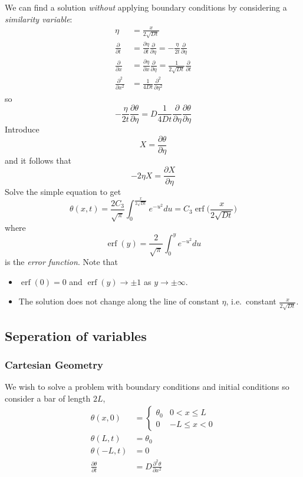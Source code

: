 \documentclass[a4paper]{article}
\DeclareMathOperator{\erf}{erf}
\begin{document}
We can find a solution \emph{without} applying boundary conditions by considering a \emph{similarity variable}:
\begin{align*}
  \eta &= \frac{x}{2\sqrt{Dt}} \\
  \frac{\partial  }{\partial t} &= \frac{\partial \eta}{\partial t} \frac{\partial  }{\partial \eta} = -\frac{\eta}{2t} \frac{\partial  }{\partial \eta} \\
  \frac{\partial  }{\partial x} &= \frac{\partial \eta}{\partial x} \frac{\partial  }{\partial \eta} = \frac{1}{2\sqrt{Dt}} \frac{\partial  }{\partial t} \\
  \frac{\partial^2  }{\partial x^2} &= \frac{1}{4Dt} \frac{\partial^2  }{\partial \eta^2}
\end{align*}
so
\[
  -\frac{\eta}{2t} \frac{\partial \theta}{\partial \eta} = D \frac{1}{4Dt} \frac{\partial  }{\partial \eta} \frac{\partial \theta}{\partial \eta}
\]
Introduce
\[
  X = \frac{\partial \theta}{\partial \eta}
\]
and it follows that
\[
  -2\eta X = \frac{\partial X}{\partial \eta}
\]
Solve the simple equation to get
\[
  \theta(x,t) = \frac{2C_3}{\sqrt \pi} \int_{0}^{\frac{x}{2\sqrt{Dt}}} e^{-u^2} du  = C_3 \erf \Big( \frac{x}{2\sqrt{Dt}} \Big)
\]
where
\[
  \erf(y) = \frac{2}{\sqrt \pi} \int_{0}^{y} e^{-u^2} du
\]
is the \emph{error function}. Note that
\begin{itemize}
\item \(\erf(0) = 0\) and \(\erf(y) \to \pm 1\) as \(y \to \pm \infty\).
\item The solution does not change along the line of constant \(\eta\), i.e.\ constant \(\frac{x}{2\sqrt{Dt}}\).
\end{itemize}

\subsection{Seperation of variables}

\subsubsection{Cartesian Geometry}

We wish to solve a problem with boundary conditions and initial conditions so consider a bar of length \(2L\),
\begin{align*}
  \theta(x,0) &=
  \begin{cases}
    \theta_0 & 0 < x \leq L \\
    0 & -L \leq x < 0
  \end{cases}
  \\
  \theta(L,t) &= \theta_0 \\
  \theta(-L,t) &= 0 \\
  \frac{\partial \theta}{\partial t} &= D \frac{\partial^2 \theta}{\partial x^2}
\end{align*}
\end{document}
